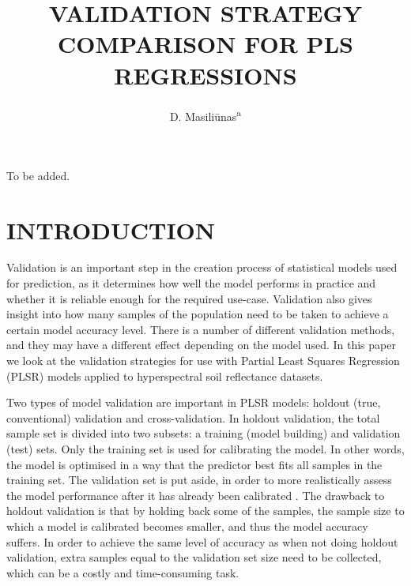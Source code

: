 \documentclass{isprs}
\begin{document}
\title{VALIDATION STRATEGY COMPARISON FOR PLS REGRESSIONS}

\author{
 D. Masili\=unas\textsuperscript{a}}

\address
{
	\textsuperscript{a }Wageningen University, Droevendaalsesteeg 3, NL 6708 PB, Wageningen, The Netherlands - dainius.masiliunas@wur.nl
}

\icwg{}   %

\abstract
{
To be added.
}


\maketitle

\section{INTRODUCTION}\label{INTRODUCTION}

Validation is an important step in the creation process of statistical models used for prediction, as it determines how well the model performs in practice and whether it is reliable enough for the required use-case. Validation also gives insight into how many samples of the population need to be taken to achieve a certain model accuracy level. There is a number of different validation methods, and they may have a different effect depending on the model used. In this paper we look at the validation strategies for use with Partial Least Squares Regression (PLSR) models applied to hyperspectral soil reflectance datasets.

Two types of model validation are important in PLSR models: holdout (true, conventional) validation and cross-validation. In holdout validation, the total sample set is divided into two subsets: a training (model building) and validation (test) sets. Only the training set is used for calibrating the model. In other words, the model is optimised in a way that the predictor best fits all samples in the training set. The validation set is put aside, in order to more realistically assess the model performance after it has already been calibrated \cite{kohavi1995study}. The drawback to holdout validation is that by holding back some of the samples, the sample size to which a model is calibrated becomes smaller, and thus the model accuracy suffers. In order to achieve the same level of accuracy as when not doing holdout validation, extra samples equal to the validation set size need to be collected, which can be a costly and time-consuming task.
\end{document}
